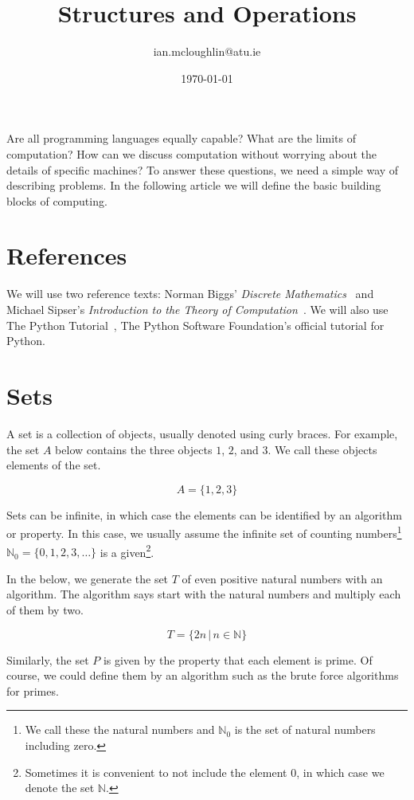 \documentclass{iansnotes}
\title{Structures and Operations}
\author{ian.mcloughlin@atu.ie}
\date{\today}
\begin{document}
\maketitle

Are all programming languages equally capable?
What are the limits of computation?
How can we discuss computation without worrying about the details of specific machines?
To answer these questions, we need a simple way of describing problems.
In the following article we will define the basic building blocks of computing.


\section{References}
  We will use two reference texts: Norman Biggs' \emph{Discrete Mathematics}~\autocite{biggs} and Michael Sipser's \emph{Introduction to the Theory of Computation}~\autocite{sipser}.
  We will also use The Python Tutorial~\autocite{pythontutorial}, The Python Software Foundation's official tutorial for Python.


\section{Sets} 
  A set is a collection of objects, usually denoted using curly braces\autocite[3]{sipser}.
  For example, the set $A$ below contains the three objects $1$, $2$, and $3$.
  We call these objects elements of the set.

  $$ A = \{ 1, 2, 3 \} $$

  Sets can be infinite, in which case the elements can be identified by an algorithm or property.
  In this case, we usually assume the infinite set of counting numbers\footnote{We call these the natural numbers and $\mathbb{N}_0$ is the set of natural numbers including zero.} $\mathbb{N}_0 = \{ 0, 1, 2, 3, \ldots \}$ is a given\footnote{Sometimes it is convenient to not include the element $0$, in which case we denote the set $\mathbb{N}$.}.

  In the below, we generate the set $T$ of even positive natural numbers with an algorithm.
  The algorithm says start with the natural numbers and multiply each of them by two.

  $$ T = \{ 2n \, | \, n \in \mathbb{N} \} $$
  
  Similarly, the set $P$ is given by the property that each element is prime.
  Of course, we could define them by an algorithm such as the brute force algorithms for primes.
  
\end{document}
